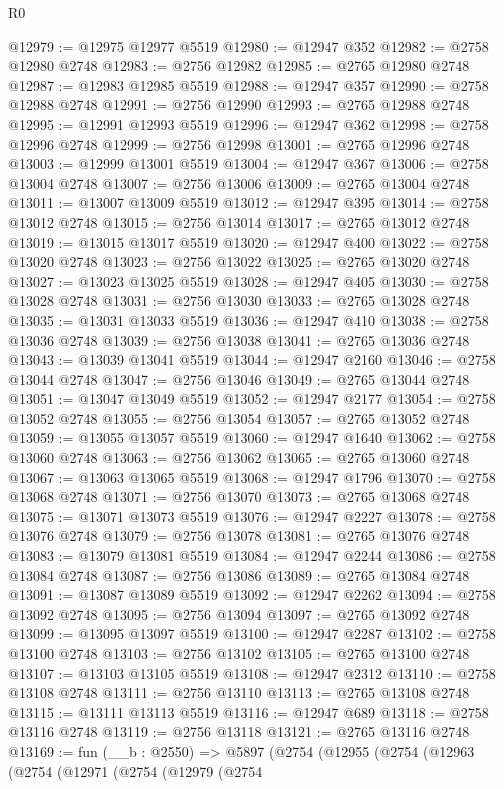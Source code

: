 \begin{lexlean}{R0}
\begin{coremodule}
@12979 := @12975 @12977 @5519
@12980 := @12947 @352
@12982 := @2758 @12980 @2748
@12983 := @2756 @12982
@12985 := @2765 @12980 @2748
@12987 := @12983 @12985 @5519
@12988 := @12947 @357
@12990 := @2758 @12988 @2748
@12991 := @2756 @12990
@12993 := @2765 @12988 @2748
@12995 := @12991 @12993 @5519
@12996 := @12947 @362
@12998 := @2758 @12996 @2748
@12999 := @2756 @12998
@13001 := @2765 @12996 @2748
@13003 := @12999 @13001 @5519
@13004 := @12947 @367
@13006 := @2758 @13004 @2748
@13007 := @2756 @13006
@13009 := @2765 @13004 @2748
@13011 := @13007 @13009 @5519
@13012 := @12947 @395
@13014 := @2758 @13012 @2748
@13015 := @2756 @13014
@13017 := @2765 @13012 @2748
@13019 := @13015 @13017 @5519
@13020 := @12947 @400
@13022 := @2758 @13020 @2748
@13023 := @2756 @13022
@13025 := @2765 @13020 @2748
@13027 := @13023 @13025 @5519
@13028 := @12947 @405
@13030 := @2758 @13028 @2748
@13031 := @2756 @13030
@13033 := @2765 @13028 @2748
@13035 := @13031 @13033 @5519
@13036 := @12947 @410
@13038 := @2758 @13036 @2748
@13039 := @2756 @13038
@13041 := @2765 @13036 @2748
@13043 := @13039 @13041 @5519
@13044 := @12947 @2160
@13046 := @2758 @13044 @2748
@13047 := @2756 @13046
@13049 := @2765 @13044 @2748
@13051 := @13047 @13049 @5519
@13052 := @12947 @2177
@13054 := @2758 @13052 @2748
@13055 := @2756 @13054
@13057 := @2765 @13052 @2748
@13059 := @13055 @13057 @5519
@13060 := @12947 @1640
@13062 := @2758 @13060 @2748
@13063 := @2756 @13062
@13065 := @2765 @13060 @2748
@13067 := @13063 @13065 @5519
@13068 := @12947 @1796
@13070 := @2758 @13068 @2748
@13071 := @2756 @13070
@13073 := @2765 @13068 @2748
@13075 := @13071 @13073 @5519
@13076 := @12947 @2227
@13078 := @2758 @13076 @2748
@13079 := @2756 @13078
@13081 := @2765 @13076 @2748
@13083 := @13079 @13081 @5519
@13084 := @12947 @2244
@13086 := @2758 @13084 @2748
@13087 := @2756 @13086
@13089 := @2765 @13084 @2748
@13091 := @13087 @13089 @5519
@13092 := @12947 @2262
@13094 := @2758 @13092 @2748
@13095 := @2756 @13094
@13097 := @2765 @13092 @2748
@13099 := @13095 @13097 @5519
@13100 := @12947 @2287
@13102 := @2758 @13100 @2748
@13103 := @2756 @13102
@13105 := @2765 @13100 @2748
@13107 := @13103 @13105 @5519
@13108 := @12947 @2312
@13110 := @2758 @13108 @2748
@13111 := @2756 @13110
@13113 := @2765 @13108 @2748
@13115 := @13111 @13113 @5519
@13116 := @12947 @689
@13118 := @2758 @13116 @2748
@13119 := @2756 @13118
@13121 := @2765 @13116 @2748
@13169 := fun (__b : @2550) =>
  @5897
    (@2754
      (@12955
        (@2754
          (@12963
            (@2754
              (@12971
                (@2754
                  (@12979
                    (@2754

\end{coremodule}
\end{lexlean}
